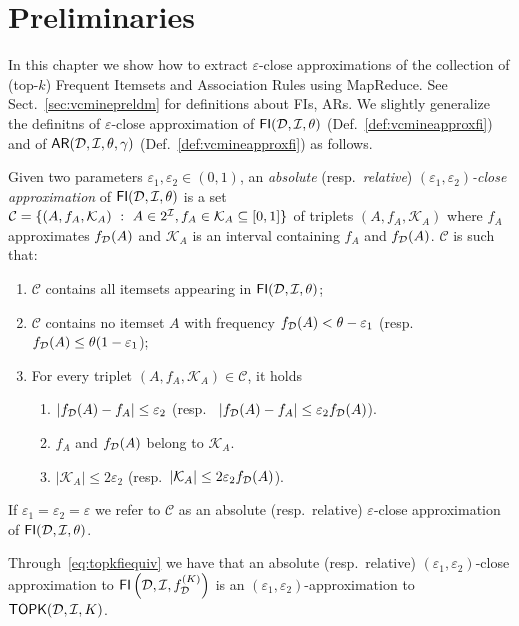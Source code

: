\section{Preliminaries} \label{sec:parmadef}
In this chapter we show how to extract $\varepsilon$-close approximations of the
collection of (top-$k$) Frequent Itemsets and Association Rules using MapReduce. See
Sect.~\ref{sec:vcminepreldm} for definitions about FIs, ARs. We slightly
generalize the definitns of $\varepsilon$-close
approximation of $\mathsf{FI}({\cal D},{\cal I},\theta)$ (Def.~\ref{def:vcmineapproxfi}) and of
$\mathsf{AR}({\cal D},{\cal I},\theta,\gamma)$ (Def.~\ref{def:vcmineapproxfi}) as follows.

\begin{definition}\label{def:parmaeapproxfi}
  Given two parameters $\varepsilon_1,\varepsilon_2\in(0,1)$, an \emph{absolute}
  (resp.~\emph{relative}) \emph{
  $(\varepsilon_1,\varepsilon_2)$-close approximation} of
  $\mathsf{FI}({\cal D},{\cal I},\theta)$ is a set $\mathcal{C}=\{(A, f_A, \mathcal{K}_A) ~:~ A\in 2^{\cal I},
  f_A\in\mathcal{K}_A\subseteq[0,1]\}$ of triplets $(A, f_A, \mathcal{K}_A)$ where
  $f_A$ approximates $f_{\cal D}(A)$ and $\mathcal{K}_A$ is an interval containing
  $f_A$ and $f_{\cal D}(A)$.
  $\mathcal{C}$ is such that:
  \begin{enumerate}
    \item $\mathcal{C}$ contains all itemsets appearing in
      $\mathsf{FI}({\cal D},{\cal I},\theta)$;
    \item $\mathcal{C}$ contains no itemset $A$ with frequency $f_{\cal D}(A)<\theta -
      \varepsilon_1$ (resp.~ $f_{\cal D}(A)\le\theta(1-\varepsilon_1$);
    \item For every triplet $(A, f_A,\mathcal{K}_A)\in\mathcal{C}$, it holds
      \begin{enumerate}
       \item $|f_{\cal D}(A)-f_A|\le\varepsilon_2$ (resp.~
	 $|f_{\cal D}(A)-f_A|\le\varepsilon_2f_{\cal D}(A)$).
       \item $f_A$ and $f_{\cal D}(A)$ belong to $\mathcal{K}_A$.
       \item $|\mathcal{K}_A|\le 2\varepsilon_2$ (resp.~$|\mathcal{K}_A|\le
	 2\varepsilon_2f_{\cal D}(A)$).
     \end{enumerate}
  \end{enumerate}
  If $\varepsilon_1=\varepsilon_2=\varepsilon$ we refer to $\mathcal{C}$ 
  as an absolute (resp.~relative) $\varepsilon$-close approximation of
  $\mathsf{FI}({\cal D},{\cal I},\theta)$.
\end{definition} 

Through~\eqref{eq:topkfiequiv} we have that an absolute (resp.~relative)
$(\varepsilon_1,\varepsilon_2)$-close approximation to
$\mathsf{FI}\left({\cal D},{\cal I},f^{(K)}_{\cal D}\right)$ is an
$(\varepsilon_1,\varepsilon_2)$-approximation to $\mathsf{TOPK}({\cal D},{\cal I},K)$.


